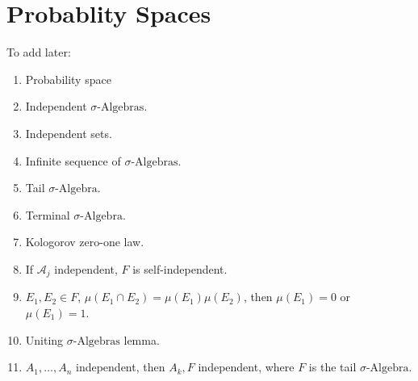         \section{Probablity Spaces}
            To add later:
            \begin{enumerate}
                \item Probability space
                \item Independent $\sigma\textrm{-Algebras}$.
                \item Independent sets.
                \item Infinite sequence of $\sigma\textrm{-Algebras}$.
                \item Tail $\sigma\textrm{-Algebra}$.
                \item Terminal $\sigma\textrm{-Algebra}$.
                \item Kologorov zero-one law.
                \item If $\mathcal{A}_{j}$ independent, $F$ is self-independent.
                \item $E_{1},E_{2}\in{F}$,
                      $\mu(E_{1}\cap{E}_{2})=\mu(E_{1})\mu(E_{2})$, then
                      $\mu(E_{1})=0$ or $\mu(E_{1})=1$.
                \item Uniting $\sigma\textrm{-Algebras}$ lemma.
                \item $A_{1},\dots,A_{n}$ independent, then $A_{k},F$ independent,
                      where $F$ is the tail $\sigma\textrm{-Algebra}$.
            \end{enumerate}
